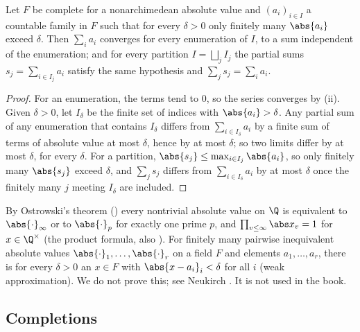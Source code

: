 \begin{lemma}\label{lem:local:summation}
Let $F$ be complete for a nonarchimedean absolute value and $(a_i)_{i\in I}$ a countable family in $F$ such that for every $\delta>0$ only
finitely many $\abs{a_i}$ exceed $\delta$. Then $\sum_ia_i$ converges for every enumeration of $I$, to a sum independent of the
enumeration; and for every partition $I=\bigsqcup_jI_j$ the partial sums $s_j=\sum_{i\in I_j}a_i$ satisfy the same hypothesis and
$\sum_js_j=\sum_ia_i$.
\end{lemma}

\begin{proof}
For an enumeration, the terms tend to $0$, so the series converges by (ii). Given $\delta>0$, let $I_\delta$ be the
finite set of indices with $\abs{a_i}>\delta$. Any partial sum of any enumeration that contains $I_\delta$ differs from
$\sum_{i\in I_\delta}a_i$ by a finite sum of terms of absolute value at most $\delta$, hence by at most $\delta$; so two limits differ by at most
$\delta$, for every $\delta$. For a partition, $\abs{s_j}\le\max_{i\in I_j}\abs{a_i}$, so only finitely many $\abs{s_j}$ exceed $\delta$, and
$\sum_js_j$ differs from $\sum_{i\in I_\delta}a_i$ by at most $\delta$ once the finitely many $j$ meeting $I_\delta$ are included.
\end{proof}

\begin{remark}\label{rem:local:ostrowski-product}
By Ostrowski's theorem () every nontrivial absolute value on $\Q$ is equivalent to $\abs{\cdot}_\infty$ or to $\abs{\cdot}_p$ for
exactly one prime $p$, and $\prod_{v\le\infty}\abs x_v=1$ for $x\in\Q^\times$ (the product formula, also ). For finitely many
pairwise inequivalent absolute values $\abs{\cdot}_1,\dots,\abs{\cdot}_r$ on a field $F$ and elements $a_1,\dots,a_r$, there is for every
$\delta>0$ an $x\in F$ with $\abs{x-a_i}_i<\delta$ for all $i$ (weak approximation). We do not prove this; see Neukirch
\cite[Chapter II, Section 3]{Neukirch}. It is not used in the book.
\end{remark}

\subsection{Completions}


